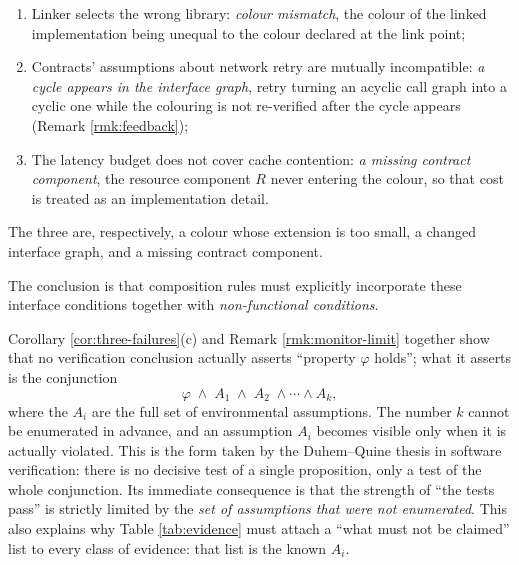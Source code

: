 \begin{corollary}\label{cor:three-failures}
\begin{enumerate}[label=(\alph*)]
\item Linker selects the wrong library: \emph{colour mismatch}, the colour of the linked
      implementation being unequal to the colour declared at the link point;
\item Contracts' assumptions about network retry are mutually incompatible: \emph{a cycle
      appears in the interface graph}, retry turning an acyclic call graph into a cyclic
      one while the colouring is not re-verified after the cycle appears
      (Remark \ref{rmk:feedback});
\item The latency budget does not cover cache contention: \emph{a missing contract
      component}, the resource component $R$ never entering the colour, so that cost is
      treated as an implementation detail.
\end{enumerate}
The three are, respectively, a colour whose extension is too small, a changed interface
graph, and a missing contract component.
\end{corollary}

The conclusion is that composition rules must explicitly incorporate these interface
conditions together with \emph{non-functional conditions}.

\begin{remark}\label{rmk:duhem}
Corollary \ref{cor:three-failures}(c) and Remark \ref{rmk:monitor-limit} together show that
no verification conclusion actually asserts ``property $\varphi$ holds''; what it asserts is
the conjunction
\[
\varphi \;\land\; A_1 \;\land\; A_2 \;\land \cdots \land A_k,
\]
where the $A_i$ are the full set of environmental assumptions. The number $k$ cannot be
enumerated in advance, and an assumption $A_i$ becomes visible only when it is actually
violated.
This is the form taken by the Duhem--Quine thesis \cite{quine1951} in software verification:
there is no decisive test of a single proposition, only a test of the whole conjunction. Its
immediate consequence is that the strength of ``the tests pass'' is strictly limited by the
\emph{set of assumptions that were not enumerated}. This also explains why
Table \ref{tab:evidence} must attach a ``what must not be claimed'' list to every class of
evidence: that list is the known $A_i$.
\end{remark}

